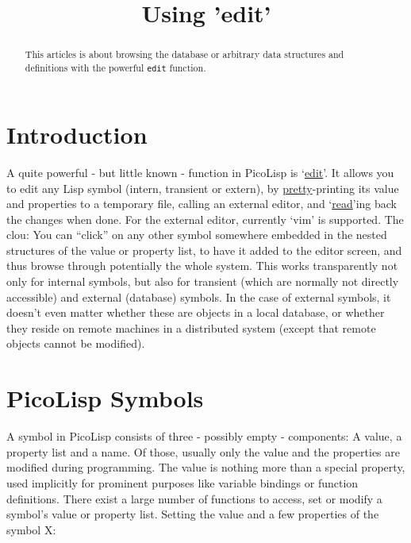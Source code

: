 \title{Using 'edit'}

\maketitle

\begin{abstract}
  This articles is about browsing the database or arbitrary data structures
  and definitions with the powerful \texttt{edit} function. 
\end{abstract}

\section{Introduction}
\label{sec:edit-introduction}

 A quite powerful - but little known - function in PicoLisp is
`\href{http://software-lab.de/doc/refE.html#edit}{edit}'.
 It allows you to edit any Lisp symbol (intern, transient or extern), by
\href{http://software-lab.de/doc/refP.html#pretty}{pretty}-printing its
value and properties to a temporary file, calling an external editor,
and `\href{http://software-lab.de/doc/refR.html#read}{read}'ing back the
changes when done. For the external editor, currently `vim' is
supported.
 The clou: You can ``click'' on any other symbol somewhere embedded in the
nested structures of the value or property list, to have it added to the
editor screen, and thus browse through potentially the whole system.
 This works transparently not only for internal symbols, but also for
transient (which are normally not directly accessible) and external
(database) symbols. In the case of external symbols, it doesn't even
matter whether these are objects in a local database, or whether they
reside on remote machines in a distributed system (except that remote
objects cannot be modified).

\section{PicoLisp Symbols}
\label{sec:edit-picolisp-symbols}


A symbol in PicoLisp consists of three - possibly empty - components: A
value, a property list and a name. Of those, usually only the value and
the properties are modified during programming. The value is nothing
more than a special property, used implicitly for prominent purposes
like variable bindings or function definitions.
 There exist a large number of functions to access, set or modify a
symbol's value or property list. Setting the value and a few properties
of the symbol X:


